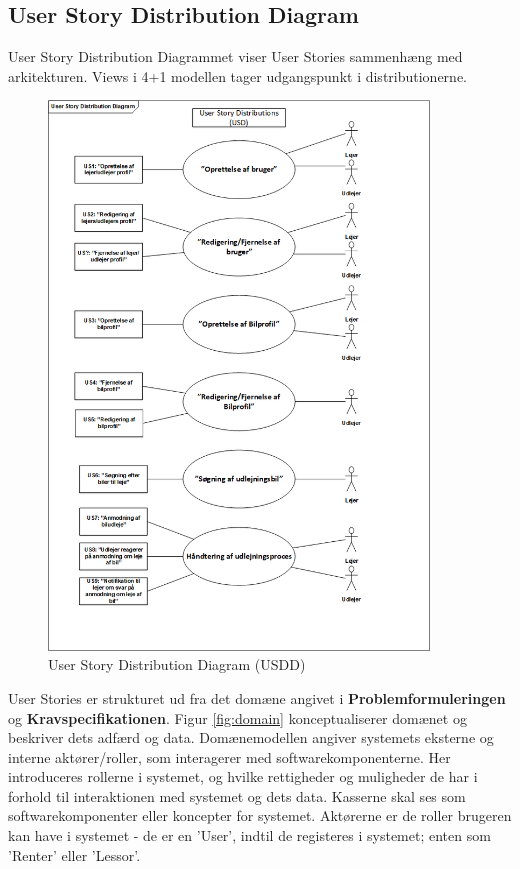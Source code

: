 \documentclass[Rapport/Rapport_main.tex]{subfiles}
\begin{document}
\subsection{User Story Distribution Diagram}
User Story Distribution Diagrammet viser User Stories sammenhæng med arkitekturen. Views i 4+1 modellen tager udgangspunkt i distributionerne. 
\begin{figure}[H]
    \centering
    \includegraphics[width=0.90\textwidth]{Kravspecifikation/Funktionelle_krav/UserStories/graphics/USDD.png}
    \caption{User Story Distribution Diagram (USDD)}
    \label{fig:USDD}
\end{figure}
User Stories er strukturet ud fra det domæne angivet i \textbf{Problemformuleringen} og \textbf{Kravspecifikationen}. Figur \ref{fig:domain} konceptualiserer domænet og beskriver dets adfærd og data. Domænemodellen angiver systemets eksterne og interne aktører/roller, som interagerer med softwarekomponenterne. Her introduceres rollerne i systemet, og hvilke rettigheder og muligheder de har i forhold til interaktionen med systemet og dets data. Kasserne skal ses som softwarekomponenter eller koncepter for systemet. Aktørerne er de roller brugeren kan have i systemet - de er en 'User', indtil de registeres i systemet; enten som 'Renter' eller 'Lessor'. 
\end{document}
